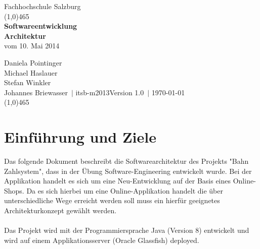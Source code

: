 \documentclass[a4paper,12pt]{article} %
\author{\theauthor\\\company}
\date{\thedate}
\title{\thetitle}
\def \theauthor  {Daniela Pointinger\\Michael Haslauer\\Stefan Winkler\\Johannes Briewasser}
\def \thedate    {\today}
\def \thetitle   {Softwareentwicklung\\Architektur}
\def \subtitle   {vom 10. Mai 2014}
\def \company    {Fachhochschule Salzburg}
\def \department {itsb-m2013}
\def \version    {1.0}
\begin{document}
\begin{titlepage}
\begin{center}
\Large\company\tiny\\
\textcolor{titlepagelinecolor}{\line(1,0){465}\\[1cm]}
\huge
\textbf{\thetitle}\\
\Large \subtitle\\[1cm]
\end{center}
\large
\theauthor\ $\mid$ \department\hfill Version \version\ $\mid$ \thedate\\[1cm]
\textcolor{titlepagelinecolor}{\line(1,0){465}\\[1cm]}
\end{titlepage}

\tableofcontents %

\newpage


\section{Einführung und Ziele}
Das folgende Dokument beschreibt die Softwarearchitektur des Projekts "Bahn Zahlsystem", dass in der Übung Software-Engineering entwickelt wurde. Bei der Applikation handelt es sich um eine Neu-Entwicklung auf der Basis eines Online-Shops. Da es sich hierbei um eine Online-Applikation handelt die über unterschiedliche Wege erreicht werden soll muss ein hierfür geeignetes Architekturkonzept gewählt werden.

\paragraph{}
Das Projekt wird mit der Programmiersprache Java (Version 8) entwickelt und wird auf einem Applikationsserver (Oracle Glassfish) deployed.
\end{document}
